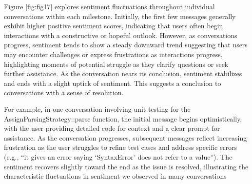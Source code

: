 Figure \ref{fig:fig17} explores sentiment fluctuations throughout individual conversations within each milestone. Initially, the first few messages generally exhibit higher positive sentiment scores, indicating that users often begin interactions with a constructive or hopeful outlook. However, as conversations progress, sentiment tends to show a steady downward trend suggesting that users may encounter challenges or express frustrations as interactions progress, highlighting moments of potential struggle as they clarify questions or seek further assistance. As the conversation nears its conclusion, sentiment stabilizes and ends with a slight uptick of sentiment. This suggests a conclusion to conversations with a sense of resolution.

For example, in one conversation involving unit testing for the AssignParsingStrategy::parse function, the initial message begins optimistically, with the user providing detailed code for context and a clear prompt for assistance. As the conversation progresses, subsequent messages reflect increasing frustration as the user struggles to refine test cases and address specific errors (e.g., “it gives an error saying ‘SyntaxError’ does not refer to a value”). The sentiment recovers slightly toward the end as the issue is resolved, illustrating the characteristic fluctuations in sentiment we observed in many conversations







